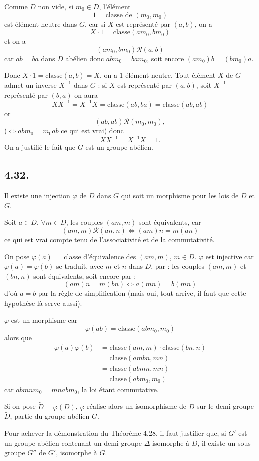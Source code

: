 Comme $D$ non vide, si $m_0\in D$, l'élément
\[
1=\text{classe de }(m_0,m_0)
\]
est élément neutre dans $G$, car si $X$ est représenté par $(a,b)$, on a
\[
X\cdot1=\text{classe}(am_0,bm_0)
\]
et on a
\[
(am_0,bm_0)\mathcal R(a,b)
\]
car $ab=ba$ dans $D$ abélien donc $abm_0=bam_0$, soit encore $(am_0)b=(bm_0)a$.

Donc $X\cdot1=\text{classe}(a,b)=X$, on a $1$ élément neutre. Tout élément $X$ de $G$ admet un inverse $X^{-1}$ dans $G$ : si $X$ est représenté par $(a,b)$, soit $X^{-1}$ représenté par $(b,a)$ on aura
\[
XX^{-1}=X^{-1}X=\text{classe}(ab,ba)=\text{classe}(ab,ab)
\]
or
\[
(ab,ab)\mathcal R(m_0,m_0),
\]
($\Longleftrightarrow abm_0=m_0ab$ ce qui est vrai) donc
\[
XX^{-1}=X^{-1}X=1.
\]
On a justifié le fait que $G$ est un groupe abélien. \bookend

\subsection*{4.32.}
Il existe une injection $\varphi$ de $D$ dans $G$ qui soit un morphisme pour les lois de $D$ et $G$.

Soit $a\in D$, $\forall m\in D$, les couples $(am,m)$ sont équivalents, car
\[
(am,m)\mathcal R(an,n)\Longleftrightarrow(am)n=m(an)
\]
ce qui est vrai compte tenu de l'associativité et de la commutativité.

On pose $\varphi(a)=$ classe d'équivalence des $(am,m)$, $m\in D$. $\varphi$ est injective car $\varphi(a)=\varphi(b)$ se traduit, avec $m$ et $n$ dans $D$, par : les couples $(am,m)$ et $(bn,n)$ sont équivalents, soit encore par :
\[
(am)n=m(bn)\Longleftrightarrow a(mn)=b(mn)
\]
d'où $a=b$ par la règle de simplification (mais oui, tout arrive, il faut que cette hypothèse là serve aussi).

$\varphi$ est un morphisme car
\[
\varphi(ab)=\text{classe}(abm_0,m_0)
\]
alors que
\begin{align*}
\varphi(a)\varphi(b)
&=\text{classe}(am,m)\cdot\text{classe}(bn,n)\\
&=\text{classe}(ambn,mn)\\
&=\text{classe}(abmn,mn)\\
&=\text{classe}(abm_0,m_0)
\end{align*}
car $abmnm_0=mnabm_0$, la loi étant commutative.

Si on pose $\widetilde D=\varphi(D)$, $\varphi$ réalise alors un isomorphisme de $D$ sur le demi-groupe $\widetilde D$, partie du groupe abélien $G$. \bookend

Pour achever la démonstration du Théorème 4.28, il faut justifier que, si $G'$ est un groupe abélien contenant un demi-groupe $\Delta$ isomorphe à $D$, il existe un sous-groupe $G''$ de $G'$, isomorphe à $G$.

